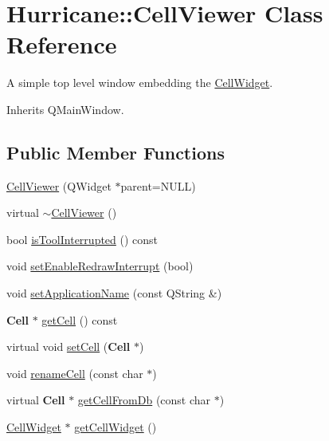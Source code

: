 \hypertarget{classHurricane_1_1CellViewer}{\section{Hurricane\-:\-:Cell\-Viewer Class Reference}
\label{classHurricane_1_1CellViewer}
}


A simple top level window embedding the \hyperlink{classHurricane_1_1CellWidget}{Cell\-Widget}.  




Inherits Q\-Main\-Window.

\subsection*{Public Member Functions}
\begin{DoxyCompactItemize}
\item 
\hyperlink{classHurricane_1_1CellViewer_a94abd334392f43bf92548ee1153be5e1}{Cell\-Viewer} (Q\-Widget $\ast$parent=N\-U\-L\-L)
\item 
virtual \hyperlink{classHurricane_1_1CellViewer_ad2573bba4536bbf2b074d98f21711fe8}{$\sim$\-Cell\-Viewer} ()
\item 
bool \hyperlink{classHurricane_1_1CellViewer_ae4fb8c98e8887c41a0994c0529b53fb7}{is\-Tool\-Interrupted} () const 
\item 
void \hyperlink{classHurricane_1_1CellViewer_a356453d6430cc64c794e49404a8657b0}{set\-Enable\-Redraw\-Interrupt} (bool)
\item 
void \hyperlink{classHurricane_1_1CellViewer_a961c789cdae39edad13f171da05f7930}{set\-Application\-Name} (const Q\-String \&)
\item 
{\bf Cell} $\ast$ \hyperlink{classHurricane_1_1CellViewer_ae80d5ed45af7a6d3441825a6d357090c}{get\-Cell} () const 
\item 
virtual void \hyperlink{classHurricane_1_1CellViewer_a5d4707b5e364b8a3a36857103bdac45d}{set\-Cell} ({\bf Cell} $\ast$)
\item 
void \hyperlink{classHurricane_1_1CellViewer_ae5d3d8c58dee944d99375650c3166587}{rename\-Cell} (const char $\ast$)
\item 
virtual {\bf Cell} $\ast$ \hyperlink{classHurricane_1_1CellViewer_a0ea301f7e85f936c38b5cd59e3752309}{get\-Cell\-From\-Db} (const char $\ast$)
\item 
\hyperlink{classHurricane_1_1CellWidget}{Cell\-Widget} $\ast$ \hyperlink{classHurricane_1_1CellViewer_a1d57547e30b1fb51aec2d0f254be6d3e}{get\-Cell\-Widget} ()

\end{DoxyCompactItemize}
